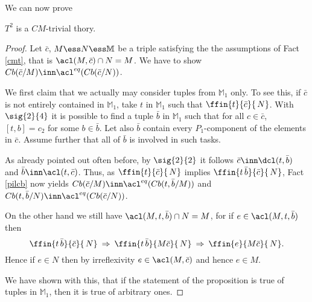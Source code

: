 \documentclass[11pt,english]{article}
\begin{document}
We can now prove 
\begin{prop}
$T^{2}$ is a $CM$-trivial thory.
\end{prop}
\begin{proof}
Let $\bar c$, $M\ess N\ess\mathbb{M}$ be a triple satisfying the the assumptions of Fact \ref{cmt}, that is
$\acl(M,\bar c)\cap N=M$. We have to show $Cb(\bar c/M)\inn\acl^{eq}(Cb(\bar c/N))$.
 
\medskip
We first claim that we actually may consider tuples from $\mathbb{M}_{1}$ only. To see this, if $\bar c$ is not
entirely contained in $\mathbb{M}_{1}$, take
$t$ in $\mathbb{M}_{1}$ such that $\ffin{t}{\bar c}{\,N}$.
With $\sig{2}{4}$ it is possible to find a tuple $\bar b$ in $\mathbb{M}_{1}$ such that
for all $c\in\bar c$, $[t,b]=c_{2}$ for some $b\in\bar b$. Let also $\bar b$ contain every $P_{1}$-component
of the elements in $\bar c$. Assume further that all of $\bar b$ is involved in such tasks.

As already pointed out often before, by $\sig{2}{2}$ it follows $\bar c\inn\dcl(t,%
\bar b)$ and $%
\bar b\inn\acl(t,\bar c)$.
Thus, as $\ffin{t}{\bar c}{\,N}$ implies $\ffin{t\,%
\bar b}{\bar c}{\,N}$, Fact \ref{pilcb} now yields $Cb(\bar c/M)\inn\acl^{eq}(Cb(t,%
\bar b/M))$ and $Cb(t,%
\bar b/N)\inn\acl^{eq}(Cb(\bar c/N))$.
 
On the other hand we still have $\acl(M,t,%
\bar b)\cap N=M$, for if $e\in\acl(M,t,%
\bar b)$ then
$$\ffin{t\,%
\bar b}{\bar c}{\,N}\:\Rightarrow\:\ffin{t\,%
\bar b}{M\bar c}{\,N}\:\Rightarrow\:\ffin{e}{M\bar c}{\,N}.$$
Hence if $e\in N$ then by irreflexivity $e\in\acl(M,\bar c)$ and hence $e\in M$. 

We have shown with this, that if the statement of the proposition is true of tuples in $\mathbb{M}_{1}$, then it is true of
arbitrary ones.
 




\end{proof}
\end{document}
